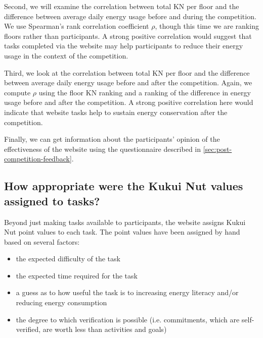 Second, we will examine the correlation between total KN per floor and the difference between average daily energy usage before and during the competition. We use Spearman's rank correlation coefficient $\rho$, though this time we are ranking floors rather than participants. A strong positive correlation would suggest that tasks completed via the website may help participants to reduce their energy usage in the context of the competition.

Third, we look at the correlation between total KN per floor and the difference between average daily energy usage before and after the competition. Again, we compute $\rho$ using the floor KN ranking and a ranking of the difference in energy usage before and after the competition. A strong positive correlation here would indicate that website tasks help to sustain energy conservation after the competition.

Finally, we can get information about the participants' opinion of the effectiveness of the website using the questionnaire described in \autoref{sec:post-competition-feedback}.

\subsection{How appropriate were the Kukui Nut values assigned to tasks?}

Beyond just making tasks available to participants, the website assigns Kukui Nut point values to each task. The point values have been assigned by hand based on several factors:

\begin{itemize}
	\item the expected difficulty of the task
	\item the expected time required for the task
	\item a guess as to how useful the task is to increasing energy literacy and/or reducing energy consumption
	\item the degree to which verification is possible (i.e. commitments, which are self-verified, are worth less than activities and goals)
\end{itemize}



